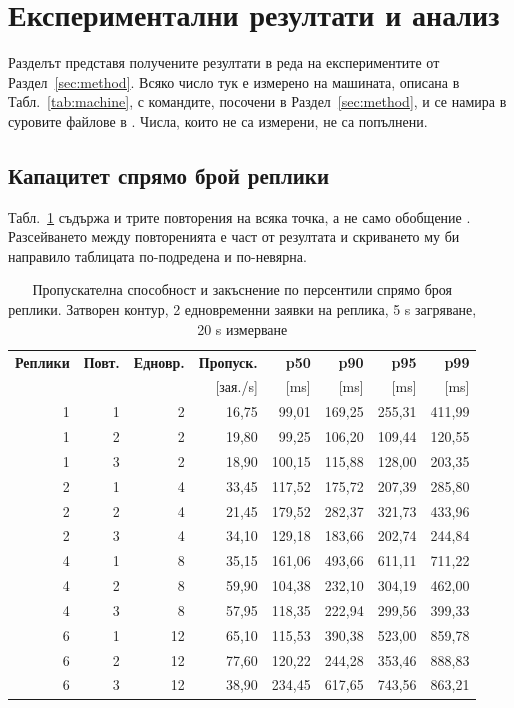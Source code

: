 \section{Експериментални резултати и анализ}
\label{sec:results}

Разделът представя получените резултати в реда на експериментите от
Раздел~\ref{sec:method}. Всяко число тук е измерено на машината, описана в
Табл.~\ref{tab:machine}, с командите, посочени в Раздел~\ref{sec:method}, и се намира в
суровите файлове в . Числа, които не са измерени, не са попълнени.

\subsection{Капацитет спрямо брой реплики}

Табл.~\ref{tab:throughput} съдържа и трите повторения на всяка точка, а не само
обобщение . Разсейването между повторенията е част от резултата и
скриването му би направило таблицата по-подредена и по-невярна.

\begin{table}[H]
\caption{Пропускателна способност и закъснение по персентили спрямо броя реплики. Затворен контур, 2 едновременни заявки на реплика, 5 s загряване, 20 s измерване}
\label{tab:throughput}
\centering
\begin{tabular}{@{}rrrrrrrr@{}}
\toprule
\textbf{Реплики} & \textbf{Повт.} & \textbf{Едновр.} & \textbf{Пропуск.} &
\textbf{p50} & \textbf{p90} & \textbf{p95} & \textbf{p99} \\
 & & & [зая./s] & [ms] & [ms] & [ms] & [ms] \\
\midrule
1 & 1 & 2  & 16{,}75 & 99{,}01  & 169{,}25 & 255{,}31 & 411{,}99 \\
1 & 2 & 2  & 19{,}80 & 99{,}25  & 106{,}20 & 109{,}44 & 120{,}55 \\
1 & 3 & 2  & 18{,}90 & 100{,}15 & 115{,}88 & 128{,}00 & 203{,}35 \\
\midrule
2 & 1 & 4  & 33{,}45 & 117{,}52 & 175{,}72 & 207{,}39 & 285{,}80 \\
2 & 2 & 4  & 21{,}45 & 179{,}52 & 282{,}37 & 321{,}73 & 433{,}96 \\
2 & 3 & 4  & 34{,}10 & 129{,}18 & 183{,}66 & 202{,}74 & 244{,}84 \\
\midrule
4 & 1 & 8  & 35{,}15 & 161{,}06 & 493{,}66 & 611{,}11 & 711{,}22 \\
4 & 2 & 8  & 59{,}90 & 104{,}38 & 232{,}10 & 304{,}19 & 462{,}00 \\
4 & 3 & 8  & 57{,}95 & 118{,}35 & 222{,}94 & 299{,}56 & 399{,}33 \\
\midrule
6 & 1 & 12 & 65{,}10 & 115{,}53 & 390{,}38 & 523{,}00 & 859{,}78 \\
6 & 2 & 12 & 77{,}60 & 120{,}22 & 244{,}28 & 353{,}46 & 888{,}83 \\
6 & 3 & 12 & 38{,}90 & 234{,}45 & 617{,}65 & 743{,}56 & 863{,}21 \\
\bottomrule
\end{tabular}
\end{table}

